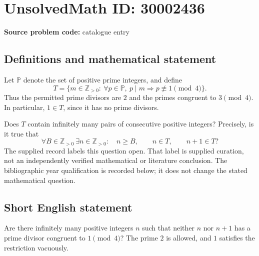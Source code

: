 \documentclass[11pt]{article}
\newcommand{\Z}{\mathbb{Z}}
\begin{document}
\section*{UnsolvedMath ID: 30002436}
\textbf{Source problem code:} catalogue entry
\subsection{Definitions and mathematical statement}
Let \(\mathbb{P}\) denote the set of positive prime integers, and define
\[
T=\{m\in\Z_{>0}:\ \forall p\in\mathbb{P},\ p\mid m\Longrightarrow p\not\equiv 1\pmod 4\}.
\]
Thus the permitted prime divisors are \(2\) and the primes congruent to \(3\pmod 4\). In particular, \(1\in T\), since it has no prime divisors.

Does \(T\) contain infinitely many pairs of consecutive positive integers? Precisely, is it true that
\[
\forall B\in\Z_{>0}\ \exists n\in\Z_{>0}:\quad n\ge B,\qquad n\in T,\qquad n+1\in T?
\]
The supplied record labels this question open. That label is supplied curation, not an independently verified mathematical or literature conclusion. The bibliographic year qualification is recorded below; it does not change the stated mathematical question.
\subsection{Short English statement}
Are there infinitely many positive integers \(n\) such that neither \(n\) nor \(n+1\) has a prime divisor congruent to \(1\pmod 4\)? The prime \(2\) is allowed, and \(1\) satisfies the restriction vacuously.
\end{document}
